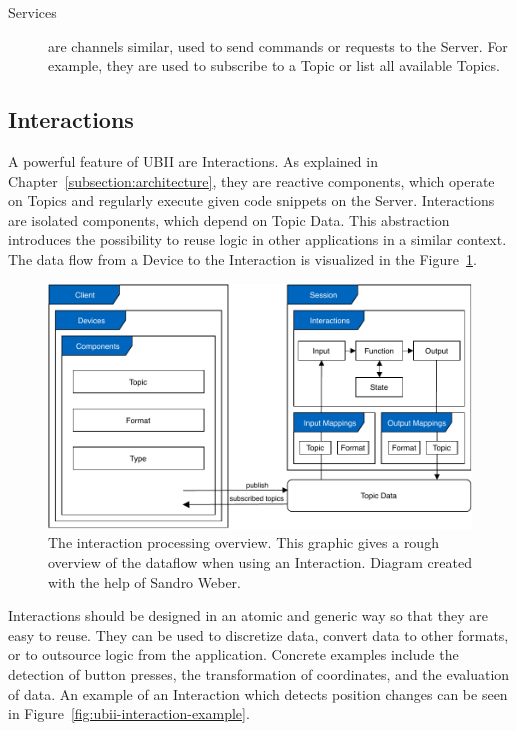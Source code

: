 \begin{description}
	\item[Services] are channels similar, used to send commands or requests to the Server. For example, they are used to subscribe to a Topic or list all available Topics.
\end{description}


\subsection{Interactions}\label{subsection:interactions}
A powerful feature of \gls{UBII} are Interactions. As explained in Chapter~\ref{subsection:architecture}, they are reactive components, which operate on Topics and regularly execute given code snippets on the Server. Interactions are isolated components, which depend on Topic Data. This abstraction introduces the possibility to reuse logic in other applications in a similar context. The data flow from a Device to the Interaction is visualized in the Figure~\ref{fig:ubii-cd}.

\begin{figure}[H]
	\centering
	\includegraphics[width=12cm]{figures/implementation/ubii_cd.pdf}%
	\caption[UBII communication diagram]{The interaction processing overview. This graphic gives a rough overview of the dataflow when using an Interaction. Diagram created with the help of Sandro Weber.}\label{fig:ubii-cd}
\end{figure}

Interactions should be designed in an atomic and generic way so that they are easy to reuse. They can be used to discretize data, convert data to other formats, or to outsource logic from the application. Concrete examples include the detection of button presses, the transformation of coordinates, and the evaluation of data. An example of an Interaction which detects position changes can be seen in Figure~\ref{fig:ubii-interaction-example}.

